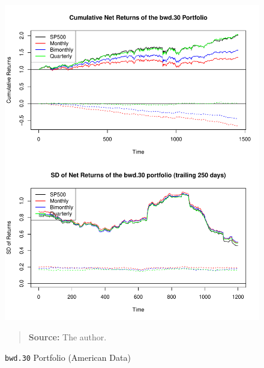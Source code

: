 \documentclass[preprint, doubleblind, authoryear,10pt]{elsarticle}
\begin{document}
\begin{figure}[htpb]
\centering
\footnotesize
\caption{\texttt{bwd.30} Portfolio (American Data)}
\label{fig:spy:bwd.30}
\includegraphics[width=.95\linewidth]{./figs/SP500-retac-bwd-30.pdf}
\begin{quote}
\textbf{Source:} The author.
\end{quote}
\end{figure}
\end{document}
